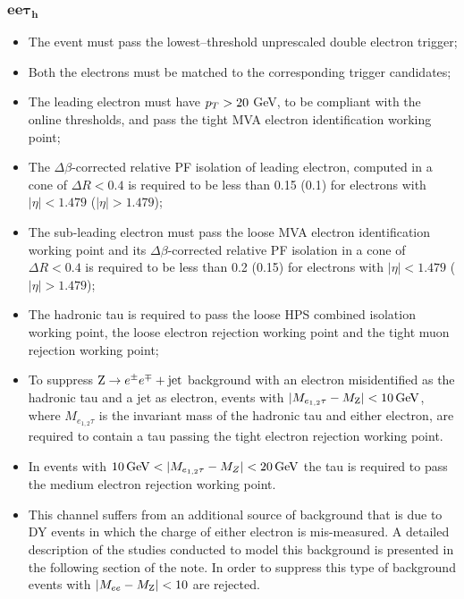 \subsubsection{$\boldsymbol{ee\tau_h}$}
\begin{itemize}
\item The event must pass the lowest--threshold unprescaled double electron trigger; 
\item Both the electrons must be matched to the corresponding trigger candidates;
\item The leading electron must have $p_{T} > 20$ GeV, to be compliant with the online thresholds, and pass the tight MVA electron identification working point;
\item The $\Delta \beta$-corrected relative PF isolation of leading electron, computed in a cone of $\Delta R < 0.4$ is required to be less than 0.15 (0.1) for electrons with $|\eta| < 1.479$ ($|\eta| > 1.479$);
\item The sub-leading electron must pass the loose MVA electron identification working point and its $\Delta \beta$-corrected relative PF isolation in a cone of $\Delta R < 0.4$ is required to be less than 0.2 (0.15) for electrons with $|\eta| < 1.479$ ($|\eta| > 1.479$);
\item The hadronic tau is required to pass the loose HPS combined isolation working point, the loose electron rejection working point and the tight muon rejection working point;
\item To suppress $\mathrm{Z}\rightarrow e^\pm e^\mp+\mathrm{jet}$ background with an electron misidentified as the hadronic tau and a jet as electron, events with $|M_{e_{1,2}\tau} - M_{\mathrm{Z}}| < 10\, \mathrm{GeV}$, where $M_{e_{1,2}\tau}$ is the invariant mass of the hadronic tau and either electron, are required to contain a tau passing the tight electron rejection working point.                                                                         
\item In events with $10\, \mathrm{GeV} < |M_{e_{1,2}\tau} - M_Z| < 20\, \mathrm{GeV}$ the tau is required to pass the medium electron rejection working point.                                                               
\item This channel suffers from an additional source of background that is due to DY events in which the charge of either electron is mis-measured. %
A detailed description of the studies conducted to model this background is presented in the following section of the note. In order to suppress this type of background events with $|M_{ee} - M_{\mathrm{Z}}| < 10$ are rejected.                                                                                                                                                                 
\end{itemize}

